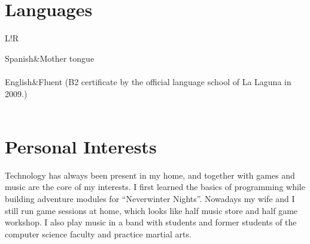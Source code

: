 \documentclass[10pt]{article}
\newcommand\VRule{\color{lightgray}\vrule width 0.5pt}
\begin{document}
    \section*{Languages}
    \begin{tabular}{L!{\VRule}R}

        Spanish&Mother tongue\\\\

        English&Fluent (B2 certificate by the official language school of La Laguna in 2009.)\\\\

    \end{tabular}

    \section*{Personal Interests}
    Technology has always been present in my home, and together with games and music are the core of my interests. I first learned the basics of programming while building adventure modules for “Neverwinter Nights”. Nowadays my wife and I still run game sessions at home, which looks like half music store and half game workshop. I also play music in a band with students and former students of the computer science faculty and practice martial arts.
\end{document}
